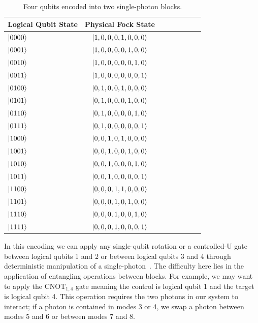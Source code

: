 \documentclass[aps,pra,twocolumn,showpacs,superscriptaddress,floatfix,10pt]{revtex4}
\begin{document}
\begin {table}[h]
\begin{center}
	\begin{tabular}{l*{6}{c}r} 
		Logical Qubit State      \quad \quad \quad     & Physical Fock State \\
		\hline 
		\quad \quad \quad $\ket{0000}$     & $\ket{1,0,0,0,1,0,0,0}$ \\
		\quad \quad \quad $\ket{0001}$            & $\ket{1,0,0,0,0,1,0,0}$ \\
		\quad \quad \quad $\ket{0010}$           & 
		$\ket{1,0,0,0,0,0,1,0}$ \\
		\quad \quad \quad $\ket{0011}$           & 
		$\ket{1,0,0,0,0,0,0,1}$ \\
		\quad \quad \quad $\ket{0100}$           & 
		$\ket{0,1,0,0,1,0,0,0}$ \\
		\quad \quad \quad $\ket{0101}$           & 
		$\ket{0,1,0,0,0,1,0,0}$ \\
		\quad \quad \quad $\ket{0110}$           & 
		$\ket{0,1,0,0,0,0,1,0}$ \\
		\quad \quad \quad $\ket{0111}$            & $\ket{0,1,0,0,0,0,0,1}$ \\
		\quad \quad \quad $\ket{1000}$            & $\ket{0,0,1,0,1,0,0,0}$ \\
		\quad \quad \quad $\ket{1001}$            & $\ket{0,0,1,0,0,1,0,0}$ \\
		\quad \quad \quad $\ket{1010}$            & $\ket{0,0,1,0,0,0,1,0}$ \\
		\quad \quad \quad $\ket{1011}$            & $\ket{0,0,1,0,0,0,0,1}$ \\
		\quad \quad \quad $\ket{1100}$            & $\ket{0,0,0,1,1,0,0,0}$ \\
		\quad \quad \quad $\ket{1101}$            & $\ket{0,0,0,1,0,1,0,0}$ \\
		\quad \quad \quad $\ket{1110}$            & $\ket{0,0,0,1,0,0,1,0}$ \\
		\quad \quad \quad $\ket{1111}$            & $\ket{0,0,0,1,0,0,0,1}$ \\
	\end{tabular}
	\caption{ \label{Block Encoding Table} Four qubits encoded into two single-photon blocks.}
\end{center}
\end{table}
In this encoding we can apply any single-qubit rotation or a controlled-U gate between logical qubits 1 and 2 or between logical qubits 3 and 4 through deterministic manipulation of a single-photon~\cite{Review Paper,Adami,Lanyon,Bao,Zadeh}. The difficulty here lies in the application of entangling operations between blocks. For example, we may want to apply the $\mbox{CNOT}_{1,4}$ gate meaning the control is logical qubit 1 and the target is logical qubit 4. This operation requires the two photons in our system to interact; if a photon is contained in modes 3 or 4, we swap a photon between modes 5 and 6 or between modes 7 and 8. 
\end{document}
